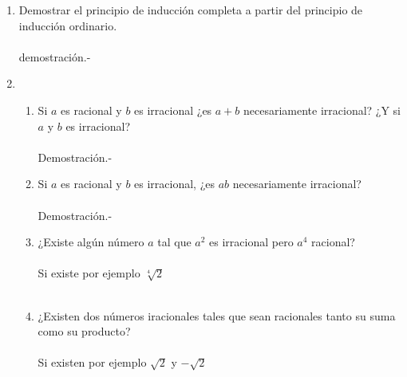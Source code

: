 \begin{enumerate}
\item Demostrar el principio de inducción completa a partir del principio de inducción ordinario.\\\\
demostración.- \; 

\item 
\begin{enumerate}[\bfseries (a)]
\item Si $a$ es racional y \; $b$ es irracional ¿es $a+b$ necesariamente irracional? ¿Y si $a$ \; y \; $b$ es irracional? \\\\
Demostración.- \; 

\item Si $a$ es racional y \; $b$ es irracional, ¿es $ab$ necesariamente irracional?\\\\
Demostración.- \; 

\item ¿Existe algún número $a$ tal que $a^2$ es irracional pero $a^4$ racional?\\\\
Si existe por ejemplo $\sqrt[4]{2}$\\\\

\item ¿Existen dos números iracionales tales que sean racionales tanto su suma como su producto?\\\\
Si existen por ejemplo $\sqrt{2}$ y $- \sqrt{2}$\\\\
\end{enumerate}


\end{enumerate}
